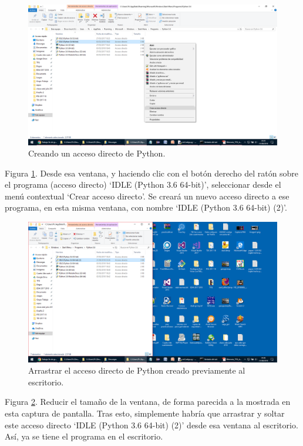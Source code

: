 \begin{figure}[h!]
  	\centering
	\includegraphics[width=\textwidth]{CapturasInstalacionPython/unnamed(10).png}
	\caption{Creando un acceso directo de Python.
	\label{fig:CapturasInstalacionPython/unnamed(10).png}}
\end{figure}

Figura \ref{fig:CapturasInstalacionPython/unnamed(10).png}. Desde esa ventana, y haciendo clic con el botón derecho del ratón sobre el programa (acceso directo) ‘IDLE (Python 3.6 64-bit)’, seleccionar desde el menú contextual ‘Crear acceso directo’. Se creará un nuevo acceso directo a ese programa, en esta misma ventana, con nombre ‘IDLE (Python 3.6 64-bit) (2)’.

\begin{figure}[h!]
  	\centering
	\includegraphics[width=\textwidth]{CapturasInstalacionPython/unnamed(11).png}
	\caption{Arrastrar el acceso directo de Python creado previamente al escritorio.
	\label{fig:CapturasInstalacionPython/unnamed(11).png}}
\end{figure}

Figura \ref{fig:CapturasInstalacionPython/unnamed(11).png}. Reducir el tamaño de la ventana, de forma parecida a la mostrada en esta captura de pantalla. Tras esto, simplemente habría que arrastrar y soltar este acceso directo ‘IDLE (Python 3.6 64-bit) (2)’ desde esa ventana al escritorio. Así, ya se tiene el programa en el escritorio.

